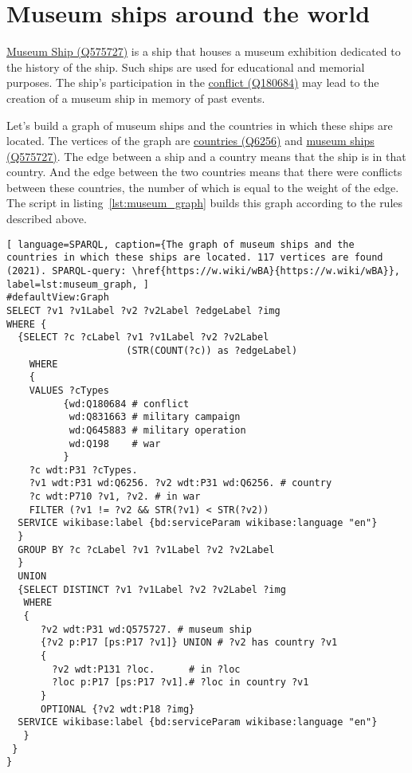 \section{Museum ships around the world}
\href{https://www.wikidata.org/wiki/Q575727}{Museum Ship (Q575727)} is a ship that houses a museum exhibition dedicated to the history of the ship. Such ships are used for educational and memorial purposes. The ship's participation in the \href{https://www.wikidata.org/wiki/Q180684}{conflict (Q180684)} may lead to the creation of a museum ship in memory of past events.

Let's build a graph of museum ships and the countries in which these ships are located. The vertices of the graph are \href{https://www.wikidata.org/wiki/Q6256}{countries (Q6256)} and \href{https://www.wikidata.org/wiki/Q575727}{museum ships (Q575727)}. The edge between a ship and a country means that the ship is in that country. And the edge between the two countries means that there were conflicts between these countries, the number of which is equal to the weight of the edge. The script in listing~\ref{lst:museum_graph} builds this graph according to the rules described above.


\begin{lstlisting}[ language=SPARQL, caption={The graph of museum ships and the countries in which these ships are located. 117 vertices are found (2021). SPARQL-query: \href{https://w.wiki/wBA}{https://w.wiki/wBA}}, label=lst:museum_graph, ]
#defaultView:Graph    
SELECT ?v1 ?v1Label ?v2 ?v2Label ?edgeLabel ?img 
WHERE {
  {SELECT ?c ?cLabel ?v1 ?v1Label ?v2 ?v2Label 
                     (STR(COUNT(?c)) as ?edgeLabel) 
    WHERE
    {
    VALUES ?cTypes 
          {wd:Q180684 # conflict
           wd:Q831663 # military campaign
           wd:Q645883 # military operation
           wd:Q198    # war
          } 
    ?c wdt:P31 ?cTypes.
    ?v1 wdt:P31 wd:Q6256. ?v2 wdt:P31 wd:Q6256. # country
    ?c wdt:P710 ?v1, ?v2. # in war
    FILTER (?v1 != ?v2 && STR(?v1) < STR(?v2)) 
  SERVICE wikibase:label {bd:serviceParam wikibase:language "en"}
  }
  GROUP BY ?c ?cLabel ?v1 ?v1Label ?v2 ?v2Label
  }
  UNION
  {SELECT DISTINCT ?v1 ?v1Label ?v2 ?v2Label ?img
   WHERE
   {
      ?v2 wdt:P31 wd:Q575727. # museum ship
      {?v2 p:P17 [ps:P17 ?v1]} UNION # ?v2 has country ?v1
      {
        ?v2 wdt:P131 ?loc.      # in ?loc
        ?loc p:P17 [ps:P17 ?v1].# ?loc in country ?v1
      }
      OPTIONAL {?v2 wdt:P18 ?img}
  SERVICE wikibase:label {bd:serviceParam wikibase:language "en"}
   }
 }
}
\end{lstlisting}

